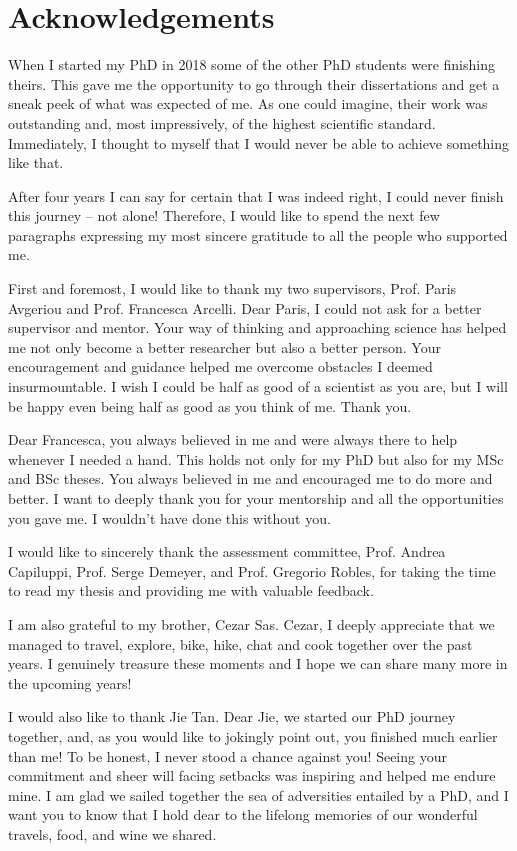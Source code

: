 \chapter*{Acknowledgements}

When I started my PhD in 2018 some of the other PhD students were finishing theirs.
This gave me the opportunity to go through their dissertations and get a sneak peek of what was expected of me.
As one could imagine, their work was outstanding and, most impressively, of the highest scientific standard.
Immediately, I thought to myself that I would never be able to achieve something like that.

After four years I can say for certain that I was indeed right, I could never finish this journey -- not alone!
Therefore, I would like to spend the next few paragraphs expressing my most sincere gratitude to all the people who supported me.

First and foremost, I would like to thank my two supervisors, Prof. Paris Avgeriou and Prof. Francesca Arcelli.
Dear Paris, I could not ask for a better supervisor and mentor. Your way of thinking and approaching science has helped me not only become a better researcher but also a better person. 
Your encouragement and guidance helped me overcome obstacles I deemed insurmountable.
I wish I could be half as good of a scientist as you are, but I will be happy even being half as good as you think of me. Thank you.

Dear Francesca, you always believed in me and were always there to help whenever I needed a hand. This holds not only for my PhD but also for my MSc and BSc theses.
You always believed in me and encouraged me to do more and better. I want to deeply thank you for your mentorship and all the opportunities you gave me. I wouldn't have done this without you.

I would like to sincerely thank the assessment committee, Prof. Andrea Capiluppi, Prof. Serge Demeyer, and Prof.  Gregorio Robles, for taking the time to read my thesis and providing me with valuable feedback.

I am also grateful to my brother, Cezar Sas. Cezar, I deeply appreciate that we managed to travel, explore, bike, hike, chat and cook together over the past years. I genuinely treasure these moments and I hope we can share many more in the upcoming years! 

I would also like to thank Jie Tan. Dear Jie, we started our PhD journey together, and, as you would like to jokingly point out, you finished much earlier than me! To be honest, I never stood a chance against you! 
Seeing your commitment and sheer will facing setbacks was inspiring and helped me endure mine.
I am glad we sailed together the sea of adversities entailed by a PhD, and I want you to know that I hold dear to the lifelong memories of our wonderful travels, food, and wine we shared.


